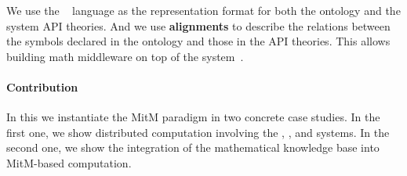 We use the \ommt~\cite{Kohlhase:OMDoc1.2,RabKoh:WSMSML13} language as the representation format for both the ontology and the system API theories.
And we use \textbf{alignments} \cite{MueGauKal:cacfms17,MueRoYuRa:abtafs17} to describe the relations between the symbols declared in the ontology and those in the API theories.
This allows building math middleware on top of the \mmt system~\cite{uniformal:on}.

\paragraph{Contribution}
In this \papertype we instantiate the MitM paradigm in two concrete case studies.
In the first one, we show distributed computation involving the \GAP, \Sage, and \Singular systems.
In the second one, we show the integration of the mathematical knowledge base \LMFDB into MitM-based computation.

%


